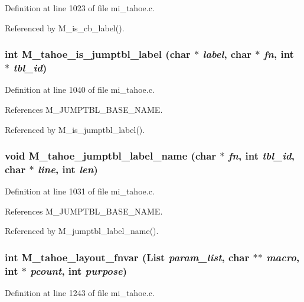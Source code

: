 Definition at line 1023 of file mi\_\-tahoe.c.

Referenced by M\_\-is\_\-cb\_\-label().
\subsubsection{\setlength{\rightskip}{0pt plus 5cm}int M\_\-tahoe\_\-is\_\-jumptbl\_\-label (char $\ast$ {\em label}, char $\ast$ {\em fn}, int $\ast$ {\em tbl\_\-id})}\label{mi__tahoe_8c_aa2b60fe38beb740f7ef8217418198ca}




Definition at line 1040 of file mi\_\-tahoe.c.

References M\_\-JUMPTBL\_\-BASE\_\-NAME.

Referenced by M\_\-is\_\-jumptbl\_\-label().
\subsubsection{\setlength{\rightskip}{0pt plus 5cm}void M\_\-tahoe\_\-jumptbl\_\-label\_\-name (char $\ast$ {\em fn}, int {\em tbl\_\-id}, char $\ast$ {\em line}, int {\em len})}\label{mi__tahoe_8c_bb22237234a735ceb38d71af32be67c7}




Definition at line 1031 of file mi\_\-tahoe.c.

References M\_\-JUMPTBL\_\-BASE\_\-NAME.

Referenced by M\_\-jumptbl\_\-label\_\-name().
\subsubsection{\setlength{\rightskip}{0pt plus 5cm}int M\_\-tahoe\_\-layout\_\-fnvar (\bf{List} {\em param\_\-list}, char $\ast$$\ast$ {\em macro}, int $\ast$ {\em pcount}, int {\em purpose})}\label{mi__tahoe_8c_e6dafb74338048f86d32cb046583abd1}




Definition at line 1243 of file mi\_\-tahoe.c.

